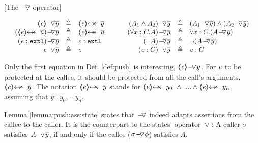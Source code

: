 \begin{definition}
\label{def:push}
[The $\FIXSymbolA$  operator]  

$
\begin{array}{c}
\begin{array}{l}
\begin{array}{rclcrcl}
  \PushAS y {\inside \re} & \triangleq &  \protectedFrom \re {\overline {y} }
  & \ \ \  \ &
  \PushAS y   {(A_1  \wedge  A_2)} & \triangleq &  (\PushAS y  { A_1})  \wedge  ( \PushAS y  {A_2} )  
\\ 
 \PushAS y {(\protectedFrom \re {\overline {u}})} &  \triangleq& \protectedFrom \re {\overline {u}} 
  & &
 \PushAS y  {(\forall x:C.A)} & \triangleq & \forall x:C.({\PushAS y A} )  
  \\  
  \PushAS y  {(\external \re)} &  \triangleq & {\external \re}  %
  & & 
  \PushAS y  {(\neg A)} &  \triangleq & \neg( {\PushAS y A} )  
    \\
     \PushAS y  {\re} &  \triangleq&   \re %
    & &
    \PushAS y  {(\re:C)} &  \triangleq&   \re:C 
 \end{array}
\end{array}
\end{array}
$
\label{f:Push}
\end{definition}

Only the first equation in  Def.  \ref{def:push}  is interesting,
  $\PushAS y {\inside \re}$.  
For $\re$ to be {protected at  the} callee, it should be protected from all the call's arguments,
\ie  $\protectedFrom {\re} {\overline {y}}$. 
The notation $\protectedFrom {\re} {\overline {y}}$   stands for $\protectedFrom \re {y_0}\  \wedge\  ...  \wedge \protectedFrom \re {y_n}$, assuming that $\overline y$=${y_0, ... y_n}$.

Lemma \ref{lemma:push:ass:state}  states that  $\FIXSymbolA$ indeed adapts assertions from the callee to the caller.
It is the counterpart to the states' operator $\pushSymbol$:
A caller   $\sigma$ satisfies  $\PushAS y A$, if and only if the callee   ($\PushASLong {\phi} {\sigma}$) %
satisfies $A$.  

